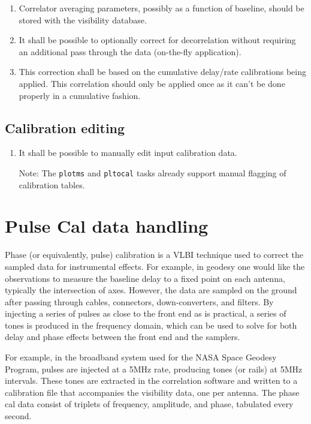 \documentclass[11pt,a4paper]{article}
\begin{document}
\begin{enumerate}[subseclist]

\item Correlator averaging parameters, possibly as a function of
  baseline, should be stored with the visibility database.

\item It shall be possible to optionally correct for decorrelation
  without requiring an additional pass through the data (on-the-fly
  application).

\item This correction shall be based on the cumulative delay/rate
  calibrations being applied.  This correlation should only be applied
  once as it can't be done properly in a cumulative fashion.

\end{enumerate}


\subsection{Calibration editing}

\begin{enumerate}[subseclist]

\item It shall be possible to manually edit input calibration data.

  Note: The \texttt{plotms} and \texttt{pltocal} tasks already support
  manual flagging of calibration tables.

\end{enumerate}


\section{Pulse Cal data handling}

Phase (or equivalently, pulse) calibration is a VLBI technique used to
correct the sampled data for instrumental effects. For example, in
geodesy one would like the observations to measure the baseline delay
to a fixed point on each antenna, typically the intersection of
axes. However, the data are sampled on the ground after passing
through cables, connectors, down-converters, and filters.  By injecting
a series of pulses as close to the front end as is practical, a series
of tones is produced in the frequency domain, which can be used to
solve for both delay and phase effects between the front end and the
samplers.

For example, in the broadband system used for the NASA Space Geodesy
Program, pulses are injected at a 5MHz rate, producing tones (or
rails) at 5MHz intervals.  These tones are extracted in the
correlation software and written to a calibration file that
accompanies the visibility data, one per antenna. The phase cal data
consist of triplets of frequency, amplitude, and phase, tabulated
every second.
\end{document}
